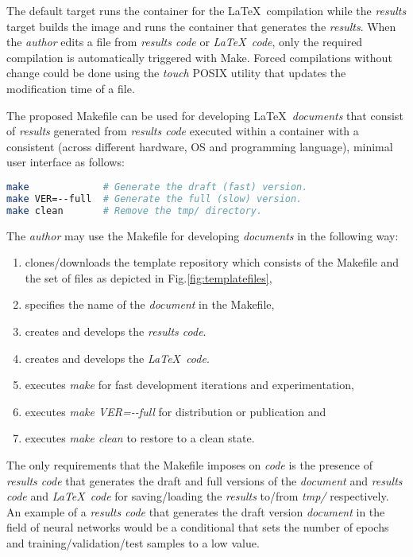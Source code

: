 \documentclass[journal]{IEEEtran}
\begin{document}
The default target runs the container for the \LaTeX\ compilation while the \textit{results} target builds the image and runs the container that generates the \textit{results}.
When the \textit{author} edits a file from \textit{results code} or \textit{\LaTeX\ code}, only the required compilation is automatically triggered with Make.
Forced compilations without change could be done using the \textit{touch} POSIX utility that updates the modification time of a file.

The proposed Makefile can be used for developing \LaTeX\ \textit{documents} that consist of \textit{results} generated from \textit{results code} executed within a container with a consistent (across different hardware, OS and programming language), minimal user interface as follows:
\begin{lstlisting}[language=bash, style=lststyle, caption={Template make options.}]
make             # Generate the draft (fast) version.
make VER=--full  # Generate the full (slow) version.
make clean       # Remove the tmp/ directory.
\end{lstlisting}

The \textit{author} may use the Makefile for developing \textit{documents} in the following way:
\begin{enumerate}
	\item clones/downloads the template repository which consists of the Makefile and the set of files as depicted in Fig.\ref{fig:templatefiles},
	\item specifies the name of the \textit{document} in the Makefile,
	\item creates and develops the \textit{results code}.
	\item creates and develops the \textit{\LaTeX\ code}.
	\item executes \textit{make} for fast development iterations and experimentation,
	\item executes \textit{make VER=-{}-full} for distribution or publication and
	\item executes \textit{make clean} to restore to a clean state.
\end{enumerate}

The only requirements that the Makefile imposes on \textit{code} is the presence of \textit{results code} that generates the draft and full versions of the \textit{document} and \textit{results code} and \textit{\LaTeX\ code} for saving/loading the \textit{results} to/from \textit{tmp/} respectively.
An example of a \textit{results code} that generates the draft version \textit{document} in the field of neural networks would be a conditional that sets the number of epochs and training/validation/test samples to a low value.
\end{document}

